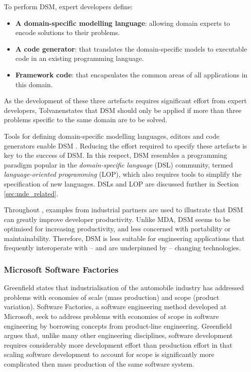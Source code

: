 To perform DSM, expert developers define:

\begin{itemize}
 \item \textbf{A domain-specific modelling language}: allowing domain experts to encode solutions to their problems.
 \item \textbf{A code generator}: that translates the domain-specific models to executable code in an existing programming language.
 \item \textbf{Framework code}: that encapsulates the common areas of all applications in this domain.
\end{itemize}

As the development of these three artefacts requires significant effort from expert developers, Tolvanen\footnotemark[\value{footnote}] states that DSM should only be applied if more than three problems specific to the same domain are to be solved.

Tools for defining domain-specific modelling languages, editors and code generators enable DSM \cite{kelly08dsm}. Reducing the effort required to specify these artefacts is key to the success of DSM. In this respect, DSM resembles a programming paradigm popular in the \textit{domain-specific language} (DSL) community, termed \textit{language-oriented programming} (LOP), which also requires tools to simplify the specification of new languages. DSLs and LOP are discussed further in Section \ref{sec:mde_related}.

Throughout \cite{kelly08dsm}, examples from industrial partners are used to illustrate that DSM can greatly improve developer productivity. Unlike MDA, DSM seems to be optimised for increasing productivity, and less concerned with portability or maintainability. Therefore, DSM is less suitable for engineering applications that frequently interoperate with -- and are underpinned by -- changing technologies.

\subsubsection{Microsoft Software Factories}
Greenfield \cite[pg159]{greenfield04software} states that industrialisation of the automobile industry has addressed problems with economies of scale (mass production) and scope (product variation). Software Factories, a software engineering method developed at Microsoft, seek to address problems with economies of scope in software engineering by borrowing concepts from product-line engineering. Greenfield \cite{greenfield04software} argues that, unlike many other engineering disciplines, software development requires considerably more development effort than production effort in that scaling software development to account for scope is significantly more complicated then mass production of the same software system.

